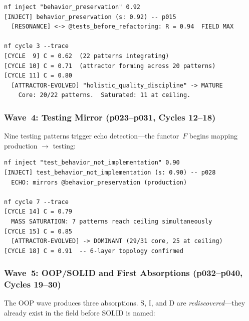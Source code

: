 \begin{terminalbox}
\begin{lstlisting}[style=neosshell]
nf inject "behavior_preservation" 0.92
[INJECT] behavior_preservation (s: 0.92) -- p015
  [RESONANCE] <-> @tests_before_refactoring: R = 0.94  FIELD MAX

nf cycle 3 --trace
[CYCLE  9] C = 0.62  (22 patterns integrating)
[CYCLE 10] C = 0.71  (attractor forming across 20 patterns)
[CYCLE 11] C = 0.80
  [ATTRACTOR-EVOLVED] "holistic_quality_discipline" -> MATURE
    Core: 20/22 patterns.  Saturated: 11 at ceiling.
\end{lstlisting}
\end{terminalbox}

\subsubsection*{Wave~4: Testing Mirror (p023--p031, Cycles 12--18)}

Nine testing patterns trigger echo detection---the functor~$F$
begins mapping production $\to$ testing:

\begin{terminalbox}
\begin{lstlisting}[style=neosshell]
nf inject "test_behavior_not_implementation" 0.90
[INJECT] test_behavior_not_implementation (s: 0.90) -- p028
  ECHO: mirrors @behavior_preservation (production)

nf cycle 7 --trace
[CYCLE 14] C = 0.79
  MASS SATURATION: 7 patterns reach ceiling simultaneously
[CYCLE 15] C = 0.85
  [ATTRACTOR-EVOLVED] -> DOMINANT (29/31 core, 25 at ceiling)
[CYCLE 18] C = 0.91  -- 6-layer topology confirmed
\end{lstlisting}
\end{terminalbox}

\subsubsection*{Wave~5: OOP/SOLID and First Absorptions (p032--p040, Cycles 19--30)}

The OOP wave produces three absorptions.  S, I, and D are
\emph{rediscovered}---they already exist in the field before SOLID
is named:

